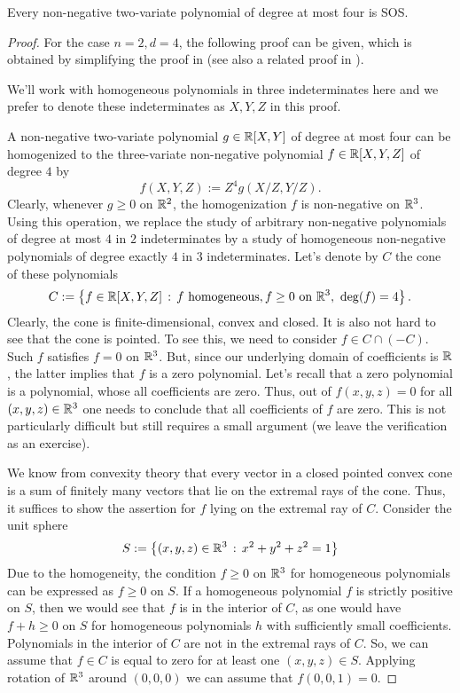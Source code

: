 \begin{theorem}[Hilbert]
	\label{thm:ternary:quartics}
	Every non-negative two-variate polynomial of degree at most four is SOS. 
\end{theorem}
\begin{proof}
	For the case $n=2, d=4$, the following proof can be given, which is obtained by simplifying the proof in \cite{Pfister:Scheiderer:2012} (see also a related proof in \cite[Prop.~6.3.4]{Bochnak:Coste:Roy:1998}). 
	
	We'll work with homogeneous polynomials in three indeterminates here and we prefer to denote these indeterminates as $X, Y, Z$ in this proof. 
	
	A non-negative two-variate polynomial $g \in \mathbb{R}[X,Y]$ of degree at most four can be homogenized to the three-variate non-negative polynomial $f \in \mathbb{R}[X,Y,Z]$ of degree $4$ by 
	\[
		f(X,Y,Z) := Z^4 g(X/Z,Y/Z).
	\]
Clearly, whenever $g \ge 0$ on $\mathbb{R}^2$, the homogenization $f$ is non-negative on $\mathbb{R}^3$. Using this operation, we replace the study of arbitrary non-negative polynomials of degree at most $4$ in $2$ indeterminates by a study of homogeneous non-negative polynomials of degree exactly $4$ in $3$ indeterminates. Let's denote by $C$ the cone of these polynomials 
	\[
		C:= \setcond{ f \in \R[X,Y,Z]}{f \ \text{homogeneous}, f \ge 0 \ \text{on} \ \R^3, \ \deg(f) = 4}.
	\]
	Clearly, the cone is finite-dimensional, convex and closed. It is also not hard to see that the cone is pointed. To see this, we need to consider $f \in C \cap (-C)$. Such $f$ satisfies $f=0$ on $\mathbb{R}^3$. But, since our underlying domain of coefficients is $\mathbb{R}$,  the latter implies that $f$ is a zero polynomial. Let's recall that a zero polynomial is a polynomial, whose all coefficients are zero. Thus, out of $f(x,y,z) =0$ for all $(x,y,z) \in \mathbb{R}^3$ one needs to conclude that all coefficients of $f$ are zero. This is not particularly difficult but still requires a small argument (we leave the verification as an exercise). 
	
	We know from convexity theory that every vector in a closed pointed convex cone is a sum of finitely many vectors that lie on the extremal rays of the cone. Thus, it suffices to show the assertion for $f$ lying on the extremal ray of $C$.	Consider the unit sphere 
	\[
		S := \left\{ (x,y,z) \in \mathbb{R}^3 \,:\, x^2 + y^2 + z^2 = 1 \right\}
	\]
	Due to the homogeneity, the condition $f \ge 0$ on $\mathbb{R}^3$ for homogeneous polynomials can be expressed as $f \ge 0$ on $S$. If a homogeneous polynomial $f$ is strictly positive on $S$, then we would see that $f$ is in the interior of $C$, as one would have $ f+ h \ge 0$ on $S$ for homogeneous polynomials $h$ with sufficiently small coefficients. Polynomials in the interior of $C$ are not in the extremal rays of $C$. So, we can assume that $f \in C$ is equal to zero for at least one $(x,y,z) \in S$. Applying rotation of $\mathbb{R}^3$ around $(0,0,0)$ we can assume that $f(0,0,1) = 0$. 
	

\end{proof}
